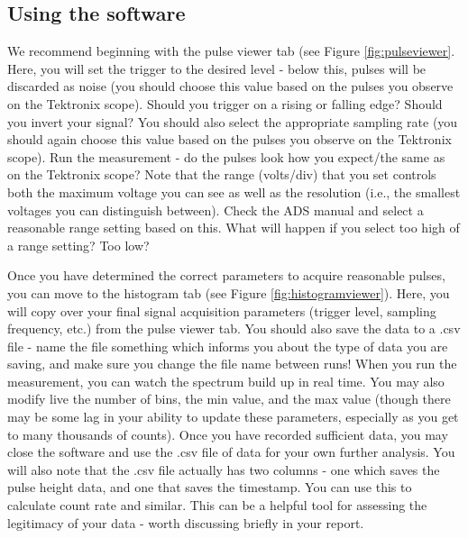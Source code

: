 \documentclass{../lab}
\begin{document}

\subsection{Using the software}
\label{sec:software}

We recommend beginning with the pulse viewer tab (see Figure \ref{fig:pulseviewer}. Here, you will set the trigger to the desired level - below this, pulses will be discarded as noise (you should choose this value based on the pulses you observe on the Tektronix scope). Should you trigger on a rising or falling edge? Should you invert your signal? You should also select the appropriate sampling rate (you should again choose this value based on the pulses you observe on the Tektronix scope). Run the measurement - do the pulses look how you expect/the same as on the Tektronix scope? Note that the range (volts/div) that you set controls both the maximum voltage you can see as well as the resolution (i.e., the smallest voltages you can distinguish between). Check the ADS manual and select a reasonable range setting based on this. What will happen if you select too high of a range setting? Too low?

Once you have determined the correct parameters to acquire reasonable pulses, you can move to the histogram tab (see Figure \ref{fig:histogramviewer}). Here, you will copy over your final signal acquisition parameters (trigger level, sampling frequency, etc.) from the pulse viewer tab. You should also save the data to a .csv file - name the file something which informs you about the type of data you are saving, and make sure you change the file name between runs! When you run the measurement, you can watch the spectrum build up in real time. You may also modify live the number of bins, the min value, and the max value (though there may be some lag in your ability to update these parameters, especially as you get to many thousands of counts). Once you have recorded sufficient data, you may close the software and use the .csv file of data for your own further analysis. You will also note that the .csv file actually has two columns - one which saves the pulse height data, and one that saves the timestamp. You can use this to calculate count rate and similar. This can be a helpful tool for assessing the legitimacy of your data - worth discussing briefly in your report.
\end{document}
